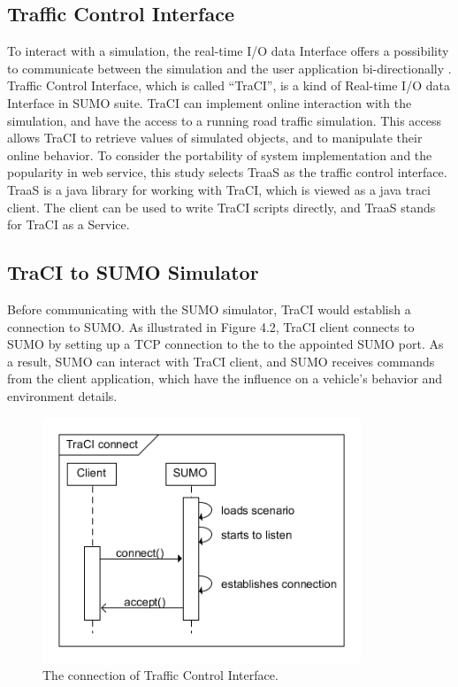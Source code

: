 \documentclass[12pt]{ksthesis}
\begin{document}
\begin{thesis}
{\section{Traffic Control Interface}
To interact with a simulation, the real-time I/O data Interface offers a possibility to communicate between the simulation and the user application bi-directionally \cite{Fischer}. Traffic Control Interface, which is called “TraCI”, is a kind of Real-time I/O data Interface in SUMO suite.
TraCI can implement online interaction with the simulation, and have the access to a running road traffic simulation. This access allows TraCI to retrieve values of simulated objects, and to manipulate their online behavior.
To consider the portability of system implementation and the popularity in web service, this study selects TraaS as the traffic control interface. TraaS is a java library for working with TraCI, which is viewed as a java traci client. The client can be used to write TraCI scripts directly, and TraaS stands for TraCI as a Service.

\subsection{TraCI to SUMO Simulator}
Before communicating with the SUMO simulator, TraCI would establish a connection to SUMO. As illustrated in Figure 4.2, TraCI client connects to SUMO by setting up a TCP connection to the to the appointed SUMO port. As a result, SUMO can interact with TraCI client, and SUMO receives commands from the client application, which have the influence on a vehicle’s behavior and environment details.

\begin{figure}[t!]
\centering
\includegraphics[width=0.85\textwidth]{./Thesis_figures/F4-2_TraCI_connection.PNG}
\caption{\large The connection of Traffic Control Interface.}
\vspace{0.5cm}
\label{Fig:TraCI_connection}
\end{figure}


}
\end{thesis}
\end{document}
